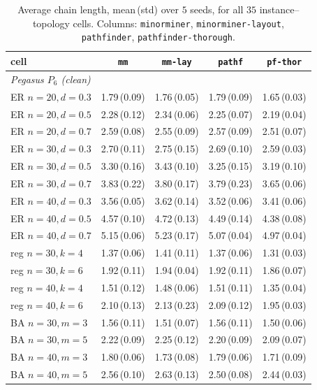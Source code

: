 \documentclass[acmsmall,anonymous,nonacm]{acmart}
\begin{document}
\begin{table}[h]
\caption{Average chain length, mean\,(std) over $5$ seeds, for all $35$
instance--topology cells. Columns: \texttt{minorminer}, \texttt{minorminer-layout},
\texttt{pathfinder}, \texttt{pathfinder-thorough}.}
\label{tab:full}
\footnotesize
\setlength{\tabcolsep}{3.5pt}
\begin{tabular}{lcccc}
\toprule
cell & \texttt{mm} & \texttt{mm-lay} & \texttt{pathf} & \texttt{pf-thor} \\
\midrule
\multicolumn{5}{l}{\emph{Pegasus $P_6$ (clean)}}\\
\midrule
ER $n{=}20,d{=}0.3$ & 1.79\,(0.09) & 1.76\,(0.05) & 1.79\,(0.09) & 1.65\,(0.03) \\
ER $n{=}20,d{=}0.5$ & 2.28\,(0.12) & 2.34\,(0.06) & 2.25\,(0.07) & 2.19\,(0.04) \\
ER $n{=}20,d{=}0.7$ & 2.59\,(0.08) & 2.55\,(0.09) & 2.57\,(0.09) & 2.51\,(0.07) \\
ER $n{=}30,d{=}0.3$ & 2.70\,(0.11) & 2.75\,(0.15) & 2.69\,(0.10) & 2.59\,(0.03) \\
ER $n{=}30,d{=}0.5$ & 3.30\,(0.16) & 3.43\,(0.10) & 3.25\,(0.15) & 3.19\,(0.10) \\
ER $n{=}30,d{=}0.7$ & 3.83\,(0.22) & 3.80\,(0.17) & 3.79\,(0.23) & 3.65\,(0.06) \\
ER $n{=}40,d{=}0.3$ & 3.56\,(0.05) & 3.62\,(0.14) & 3.52\,(0.06) & 3.41\,(0.06) \\
ER $n{=}40,d{=}0.5$ & 4.57\,(0.10) & 4.72\,(0.13) & 4.49\,(0.14) & 4.38\,(0.08) \\
ER $n{=}40,d{=}0.7$ & 5.15\,(0.06) & 5.23\,(0.17) & 5.07\,(0.04) & 4.97\,(0.04) \\
reg $n{=}30,k{=}4$ & 1.37\,(0.06) & 1.41\,(0.11) & 1.37\,(0.06) & 1.31\,(0.03) \\
reg $n{=}30,k{=}6$ & 1.92\,(0.11) & 1.94\,(0.04) & 1.92\,(0.11) & 1.86\,(0.07) \\
reg $n{=}40,k{=}4$ & 1.51\,(0.12) & 1.48\,(0.06) & 1.51\,(0.11) & 1.35\,(0.04) \\
reg $n{=}40,k{=}6$ & 2.10\,(0.13) & 2.13\,(0.23) & 2.09\,(0.12) & 1.95\,(0.03) \\
BA $n{=}30,m{=}3$ & 1.56\,(0.11) & 1.51\,(0.07) & 1.56\,(0.11) & 1.50\,(0.06) \\
BA $n{=}30,m{=}5$ & 2.22\,(0.09) & 2.25\,(0.12) & 2.20\,(0.09) & 2.09\,(0.07) \\
BA $n{=}40,m{=}3$ & 1.80\,(0.06) & 1.73\,(0.08) & 1.79\,(0.06) & 1.71\,(0.09) \\
BA $n{=}40,m{=}5$ & 2.56\,(0.10) & 2.63\,(0.13) & 2.50\,(0.08) & 2.44\,(0.03) \\

\end{tabular}
\end{table}
\end{document}
